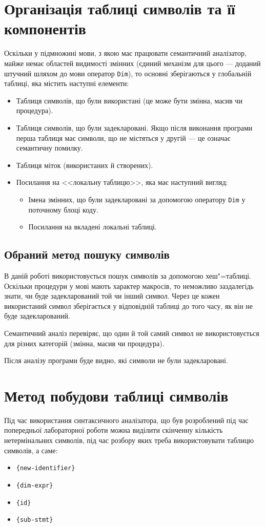 \documentclass[a4paper,12pt,notitlepage,pdftex]{scrreprt}
\begin{document}
\chapter{Організація таблиці символів та її компонентів}
\label{chap:second}
    Оскільки у підмножині мови, з якою має працювати семантичний аналізатор, майже немає областей видимості змінних
    (єдиний механізм для цього --- доданий штучний шляхом до мови оператор \verb'Dim'), то основні зберігаються у
    глобальній таблиці, яка містить наступні елементи:
    \begin{itemize}
        \item Таблиця символів, що були використані (це може бути змінна, масив чи процедура).
        \item Таблиця символів, що були задекларовані.
            Якщо після виконання програми перша таблиця має символи, що не містяться у другій --- це означає
            семантичну помилку.
        \item Таблиця міток (використаних й створених).
        \item Посилання на <<локальну таблицю>>, яка має наступний вигляд:
            \begin{itemize}
                \item Імена змінних, що були задекларовані за допомогою оператору \verb'Dim' у поточному блоці коду.
                \item Посилання на вкладені локальні таблиці.
            \end{itemize}
    \end{itemize}
    \section{Обраний метод пошуку символів}
    \label{sec:formal}
        В даній роботі використовується пошук символів за допомогою хеш"=таблиці.
        Оскільки процедури у мові мають характер макросів, то неможливо заздалегідь знати, чи буде задекларований той
        чи інший символ.
        Через це кожен використаний символ зберігається у відповідній таблиці до того часу, як він не буде
        задекларований.

        Семантичний аналіз перевіряє, що один й той самий символ не використовується для різних категорій (змінна,
        масив чи процедура).

        Після аналізу програми буде видно, які символи не були задекларовані.
\chapter{Метод побудови таблиці символів}
    Під час використання синтаксичного аналізатора, що був розроблений під час попередньої лабораторної роботи можна
    виділити скінченну кількість нетермінальних символів, під час розбору яких треба використовувати таблицю символів,
    а саме:
    \begin{itemize}
        \item \verb'{new-identifier}'
        \item \verb'{dim-expr}'
        \item \verb'{id}'
        \item \verb'{sub-stmt}'
    \end{itemize}
\end{document}
